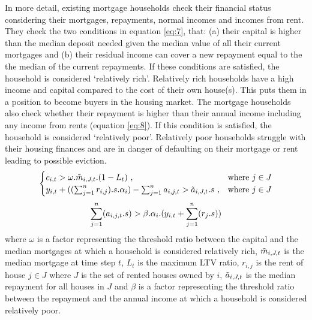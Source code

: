 In more detail, existing mortgage households check their financial status considering their mortgages, repayments, normal incomes and incomes from rent. They check the two conditions in equation \ref{eq:7}, that: (a) their capital is higher than the median deposit needed given the median value of all their current mortgages and (b) their residual income can cover a new repayment equal to the the median of the current repayments. If these conditions are satisfied, the household is considered `relatively rich'. Relatively rich households have a high income and capital compared to the cost of their own house(s). This puts them in a position to become buyers in the housing market. The mortgage households also check whether their repayment is higher than their annual income including any income from rents (equation \ref{eq:8}). If this condition is satisfied, the household is considered `relatively poor'. Relatively poor households struggle with their housing finances and are in danger of  defaulting on their mortgage or rent leading to possible eviction.
\begin{equation} \label{eq:7}
    \begin{cases}
        c_{i,t} > \omega.\Tilde{m}_{i,J,t}.(1-L_t) \text{ ,} & \text{where } j\in{J} \\
        y_{i,t} + ((\sum_{j=1}^{n}r_{i,j}).s.\alpha_i) - \sum_{j=1}^{n}a_{i,j,t} > \Tilde{a}_{i,J,t}.s \text{ ,} & \text{where } j\in{J}
    \end{cases}
\end{equation}
\begin{equation} \label{eq:8}
    \sum_{j=1}^{n}(a_{i,j,t}.s) > \beta.\alpha_i.(y_{i,t}+\sum_{j=1}^{n}(r_j.s)) \\
\end{equation}
where \(\omega\) is a factor representing the threshold ratio between the capital and the median mortgages at which a household is considered relatively rich, \(\Tilde{m}_{i,J,t}\) is the median mortgage at time step \(t\), \(L_t\) is the maximum LTV ratio, \(r_{i,j}\) is the rent of house \(j\in{J}\) where \(J\) is the set of rented houses owned by \(i\), \(\Tilde{a}_{i,J,t}\) is the median repayment for all houses in \(J\) and \(\beta\) is a factor representing the threshold ratio between the repayment and the annual income at which a household is considered relatively poor. 

